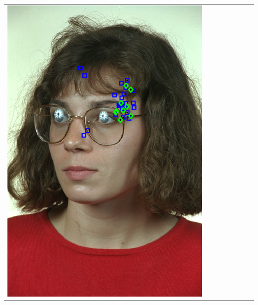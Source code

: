 \documentclass[portrait,final,a0paper,fontscale=0.277]{baposter}
\begin{document}
\begin{poster}
{{\begin{tabular}{@{}rccccccc@{}}
\parbox[c]{0.11\linewidth}{\includegraphics[width=\linewidth]{images/l_ql_fail.pdf}} &

\end{tabular}}}
\end{poster}
\end{document}
